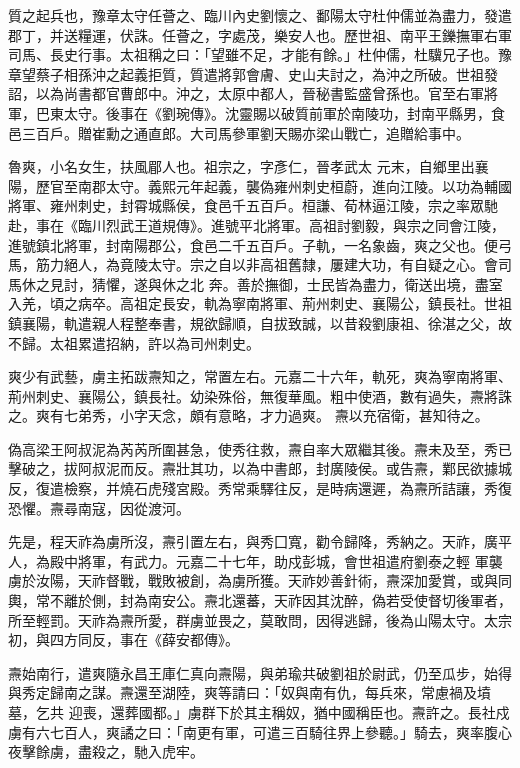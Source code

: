 \begin{pinyinscope}
 質之起兵也，豫章太守任薈之、臨川內史劉懷之、鄱陽太守杜仲儒並為盡力，發遣郡丁，并送糧運，伏誅。任薈之，字處茂，樂安人也。歷世祖、南平王鑠撫軍右軍
 司馬、長史行事。太祖稱之曰：「望雖不足，才能有餘。」杜仲儒，杜驥兄子也。豫章望蔡子相孫沖之起義拒質，質遣將郭會膚、史山夫討之，為沖之所破。世祖發詔，以為尚書都官曹郎中。沖之，太原中都人，晉秘書監盛曾孫也。官至右軍將軍，巴東太守。後事在《劉琬傳》。沈靈賜以破質前軍於南陵功，封南平縣男，食邑三百戶。贈崔勳之通直郎。大司馬參軍劉天賜亦梁山戰亡，追贈給事中。



 魯爽，小名女生，扶風郿人也。祖宗之，字彥仁，晉孝武太
 元末，自鄉里出襄陽，歷官至南郡太守。義熙元年起義，襲偽雍州刺史桓蔚，進向江陵。以功為輔國將軍、雍州刺史，封霄城縣侯，食邑千五百戶。桓謙、荀林逼江陵，宗之率眾馳赴，事在《臨川烈武王道規傳》。進號平北將軍。高祖討劉毅，與宗之同會江陵，進號鎮北將軍，封南陽郡公，食邑二千五百戶。子軌，一名象齒，爽之父也。便弓馬，筋力絕人，為竟陵太守。宗之自以非高祖舊隸，屢建大功，有自疑之心。會司馬休之見討，猜懼，遂與休之北
 奔。善於撫御，士民皆為盡力，衛送出境，盡室入羌，頃之病卒。高祖定長安，軌為寧南將軍、荊州刺史、襄陽公，鎮長社。世祖鎮襄陽，軌遣親人程整奉書，規欲歸順，自拔致誠，以昔殺劉康祖、徐湛之父，故不歸。太祖累遣招納，許以為司州刺史。



 爽少有武藝，虜主拓跋燾知之，常置左右。元嘉二十六年，軌死，爽為寧南將軍、荊州刺史、襄陽公，鎮長社。幼染殊俗，無復華風。粗中使酒，數有過失，燾將誅之。爽有七弟秀，小字天念，頗有意略，才力過爽。
 燾以充宿衛，甚知待之。



 偽高梁王阿叔泥為芮芮所圍甚急，使秀往救，燾自率大眾繼其後。燾未及至，秀已擊破之，拔阿叔泥而反。燾壯其功，以為中書郎，封廣陵侯。或告燾，鄴民欲據城反，復遣檢察，并燒石虎殘宮殿。秀常乘驛往反，是時病還遲，為燾所詰讓，秀復恐懼。燾尋南寇，因從渡河。



 先是，程天祚為虜所沒，燾引置左右，與秀囗寬，勸令歸降，秀納之。天祚，廣平人，為殿中將軍，有武力。元嘉二十七年，助戍彭城，會世祖遣府劉泰之輕
 軍襲虜於汝陽，天祚督戰，戰敗被創，為虜所獲。天祚妙善針術，燾深加愛賞，或與同輿，常不離於側，封為南安公。燾北還蕃，天祚因其沈醉，偽若受使督切後軍者，所至輕罰。天祚為燾所愛，群虜並畏之，莫敢問，因得逃歸，後為山陽太守。太宗初，與四方同反，事在《薛安都傳》。



 燾始南行，遣爽隨永昌王庫仁真向燾陽，與弟瑜共破劉祖於尉武，仍至瓜步，始得與秀定歸南之謀。燾還至湖陸，爽等請曰：「奴與南有仇，每兵來，常慮禍及墳墓，乞共
 迎喪，還葬國都。」虜群下於其主稱奴，猶中國稱臣也。燾許之。長社戍虜有六七百人，爽譎之曰：「南更有軍，可遣三百騎往界上參聽。」騎去，爽率腹心夜擊餘虜，盡殺之，馳入虎牢。




\end{pinyinscope}
